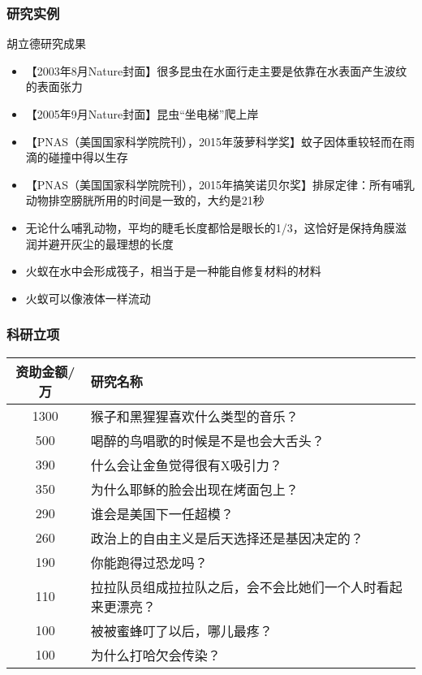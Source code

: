 \begin{frame}
  \frametitle{研究实例}
  \begin{block}{胡立德研究成果}
    \begin{itemize}
      \item 【2003年8月Nature封面】很多昆虫在水面行走主要是依靠在水表面产生波纹的表面张力
      \item 【2005年9月Nature封面】昆虫“坐电梯”爬上岸
      \item 【PNAS（美国国家科学院院刊），2015年菠萝科学奖】蚊子因体重较轻而在雨滴的碰撞中得以生存
      \item 【PNAS（美国国家科学院院刊），2015年搞笑诺贝尔奖】排尿定律：所有哺乳动物排空膀胱所用的时间是一致的，大约是21秒
      \item 无论什么哺乳动物，平均的睫毛长度都恰是眼长的1/3，这恰好是保持角膜滋润并避开灰尘的最理想的长度
      \item 火蚁在水中会形成筏子，相当于是一种能自修复材料的材料
      \item 火蚁可以像液体一样流动
    \end{itemize}
  \end{block}
\end{frame}

\begin{frame}
  \frametitle{科研立项}
    \begin{table}
    \centering
    \begin{tabular}{cl}
      \hline
      \rowcolor{blue!50}资助金额/万 & 研究名称\\
      \hline
      1300 & 猴子和黑猩猩喜欢什么类型的音乐？\\
      500 & 喝醉的鸟唱歌的时候是不是也会大舌头？\\
      390 & 什么会让金鱼觉得很有X吸引力？\\
      350 & 为什么耶稣的脸会出现在烤面包上？\\
      290 & 谁会是美国下一任超模？\\
      260 & 政治上的自由主义是后天选择还是基因决定的？\\
      190 & 你能跑得过恐龙吗？\\
      110 & {\footnotesize 拉拉队员组成拉拉队之后，会不会比她们一个人时看起来更漂亮？}\\
      100 & 被被蜜蜂叮了以后，哪儿最疼？\\
      100 & 为什么打哈欠会传染？\\
      \hline
    \end{tabular}
  \end{table}
\end{frame}

